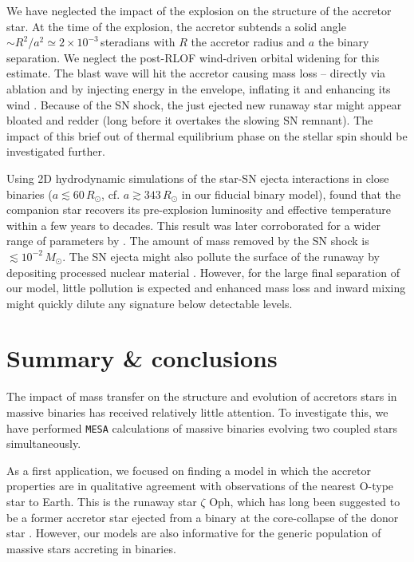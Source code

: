 \documentclass[twocolumn,twocolappendix,trackchanges]{aastex63}
\newcommand{\zoph}{$\zeta$ Oph}
\begin{document}
We have neglected the impact of the explosion on the structure of the
accretor star. At the time of the explosion, the accretor subtends a
solid angle $\sim{}R^2/a^2\simeq 2\times10^{-3}$\,steradians with $R$
the accretor radius and $a$ the binary separation. We neglect the
post-RLOF wind-driven orbital widening for this estimate.  The blast
wave will hit the accretor causing mass loss -- directly via ablation
and by injecting energy in the envelope, inflating it and enhancing
its wind \citep{wheeler:75, tauris:98, podsiadlowski:03, hirai:18, ogata:21}.
Because of the SN shock, the just ejected new runaway star might
appear bloated and redder (long before it overtakes the slowing SN
remnant). The impact of this brief out of thermal equilibrium phase on
the stellar spin should be investigated further.

Using 2D hydrodynamic simulations of the star-SN ejecta interactions
in close binaries ($a\lesssim 60\,R_\odot$,
cf. $a\gtrsim 343\,R_\odot$ in our fiducial binary model),
\cite{hirai:18} found that the companion star recovers its
pre-explosion luminosity and effective temperature within a few years
to decades. This result was later corroborated for a wider range of
parameters by \cite{ogata:21}. The amount of mass removed by the SN
shock is $\lesssim10^{-2}\,M_\odot$.  The SN ejecta might also pollute
the surface of the runaway by depositing processed nuclear material
\citep[e.g.,][]{przybilla:08, suda:21}. However, for the large final
separation of our model, little pollution is expected and enhanced
mass loss and inward mixing might quickly dilute any signature below
detectable levels.



\section{Summary \& conclusions}
\label{sec:conclusions}

The impact of mass transfer on the structure and evolution of
accretors stars in massive binaries has received relatively little
attention. To investigate this, we have performed \texttt{MESA}
calculations of massive binaries evolving two coupled stars
simultaneously.

As a first application, we focused on finding a model in which the
accretor properties are in qualitative agreement with observations of
the nearest O-type star to Earth. This is the runaway star \zoph, which has
long been suggested to be a former accretor star ejected from a binary
at the core-collapse of the donor star \citep[binary SN
scenario,][]{blaauw:61}. However, our models are also informative for
the generic population of massive stars accreting in binaries.
\end{document}
